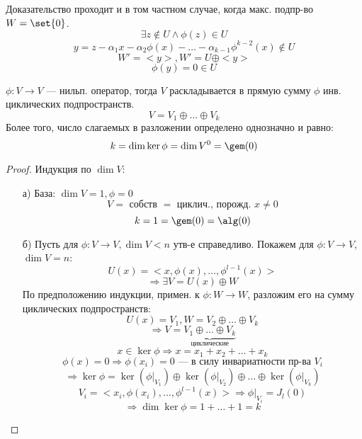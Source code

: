 \begin{note}
    Доказательство проходит и в том частном случае, когда макс. подпр-во $W = \set{0}$.
    \[
    \exists z \not \in U \land \phi(z) \in U
    \]
    \[
    y = z - \alpha_1 x - \alpha_2 \phi(x) - \ldots - \alpha_{k - 1}\phi^{k - 2}(x) \not \in U
    \]
    \[
    W' = <y> , W' = U \oplus <y>
    \]
    \[
    \phi(y) = 0 \in U
    \]
\end{note}
\begin{theorem}
\label{theorem:06_1}
    $\phi \colon V \rightarrow V$ --- нильп. оператор, тогда $V$ раскладывается в прямую сумму $\phi$ инв. циклических подпространств.
    \[
        V = V_1 \oplus \ldots \oplus V_k
    \]
    Более того, число слагаемых в разложении определено однозначно и равно:
    \[
        k = \dim \ker \phi = \dim V^{0} = \gem(0)
    \]
\end{theorem}
\begin{proof}
    Индукция по $\dim V$:
    \begin{itemize}
        \item [а) ] База: $\dim V = 1, \phi = 0$
            \[
            V = \text{ собств } = \text{ циклич., порожд. $x \neq 0$}
            \]
            \[
            k = 1 = \gem(0) = \alg(0)
            \]
        \item [б) ] Пусть для $\phi \colon V\rightarrow V, \dim V < n$ утв-е справедливо. Покажем для $\phi \colon V \rightarrow V$, $\dim V = n$:
            \[
            U(x) = <x, \phi(x), \ldots, \phi^{l - 1}(x)>
            \]
            \[
            \Rightarrow \exists V = U(x) \oplus W
            \]
            По предположению индукции, примен. к $\phi \colon W \rightarrow W$, разложим его на сумму циклических подпространств:
            \[
            U(x) = V_1, W = V_2 \oplus \ldots \oplus V_k
            \]
            \[
            \Rightarrow V = \underbrace{V_1 \oplus \ldots \oplus V_k}_{\text{циклические}}
            \]
            \[
            x \in \ker \phi \Rightarrow x = x_1 + x_2 + \ldots + x_k
            \]
            \[
            \phi(x) = 0 \Rightarrow \phi(x_i) = 0 \text{ --- в силу инвариатности пр-ва $V_i$}
            \]
            \[
            \Rightarrow \ker \phi = \ker(\phi|_{V_1}) \oplus \ker(\phi|_{V_2}) \oplus \ldots \oplus \ker(\phi|_{V_k})
            \]
            \[
            V_i = <x_i, \phi(x_i), \ldots, \phi^{l - 1}(x)> \Rightarrow \phi|_{V_i} = J_{l}(0)
            \]
            \[
            \Rightarrow \dim \ker \phi = 1 + \ldots + 1 = k
            \]
    \end{itemize}
\end{proof}
